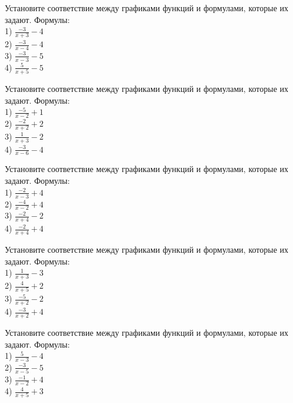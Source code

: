 \documentclass[4apaper]{article}
\begin{document}
\begin{taskBN}{51}
Установите соответствие между графиками функций и формулами, которые их задают. Формулы: \\1) $\frac{-3}{x+3}-4$\\2) $\frac{-3}{x-4}-4$\\3) $\frac{-3}{x-3}-5$\\4) $\frac{5}{x+5}-5$
\end{taskBN}

\begin{taskBN}{52}
Установите соответствие между графиками функций и формулами, которые их задают. Формулы: \\1) $\frac{-5}{x-2}+1$\\2) $\frac{-2}{x+2}+2$\\3) $\frac{1}{x+3}-2$\\4) $\frac{-3}{x-6}-4$
\end{taskBN}

\begin{taskBN}{53}
Установите соответствие между графиками функций и формулами, которые их задают. Формулы: \\1) $\frac{-2}{x-3}+4$\\2) $\frac{-4}{x-2}+4$\\3) $\frac{-2}{x+4}-2$\\4) $\frac{-2}{x+4}+4$
\end{taskBN}

\begin{taskBN}{54}
Установите соответствие между графиками функций и формулами, которые их задают. Формулы: \\1) $\frac{1}{x+3}-3$\\2) $\frac{4}{x+5}+2$\\3) $\frac{-5}{x+2}-2$\\4) $\frac{-3}{x+2}+4$
\end{taskBN}

\begin{taskBN}{55}
Установите соответствие между графиками функций и формулами, которые их задают. Формулы: \\1) $\frac{5}{x-3}-4$\\2) $\frac{-3}{x-5}-5$\\3) $\frac{-1}{x-2}+4$\\4) $\frac{4}{x+5}+3$
\end{taskBN}
\end{document}
